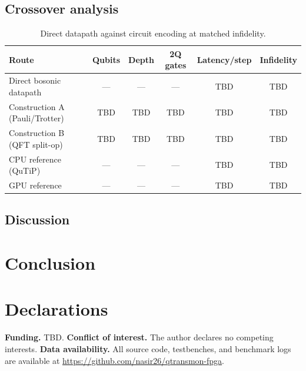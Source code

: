\documentclass[smallextended]{svjour3}
\begin{document}
\subsection{Crossover analysis}

\begin{table}[t]
\caption{Direct datapath against circuit encoding at matched infidelity.}
\label{tab:crossover}
\begin{tabular}{lccccc}
\toprule
Route & Qubits & Depth & 2Q gates & Latency/step & Infidelity \\
\midrule
Direct bosonic datapath      & --- & --- & --- & TBD & TBD \\
Construction A (Pauli/Trotter) & TBD & TBD & TBD & TBD & TBD \\
Construction B (QFT split-op)  & TBD & TBD & TBD & TBD & TBD \\
CPU reference (QuTiP)          & --- & --- & --- & TBD & TBD \\
GPU reference                  & --- & --- & --- & TBD & TBD \\
\bottomrule
\end{tabular}
\end{table}

\subsection{Discussion}


\section{Conclusion}
\label{sec:conclusion}


\begin{acknowledgements}
\end{acknowledgements}

\section*{Declarations}

\textbf{Funding.} TBD.
\textbf{Conflict of interest.} The author declares no competing interests.
\textbf{Data availability.} All source code, testbenches, and benchmark logs are
available at \url{https://github.com/nasir26/qtransmon-fpga}.



\end{document}
